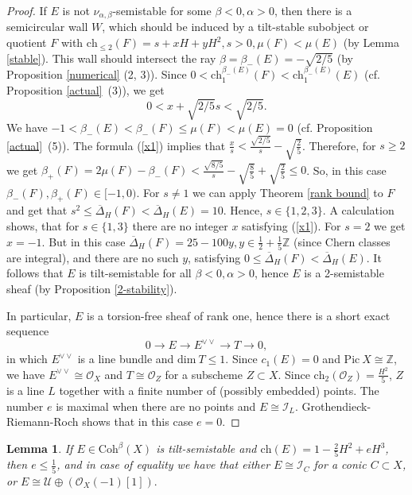 \documentclass{amsart}
\newtheorem{lemma}[theorem]{Lemma}
\begin{document}
	\begin{proof}If $E$ is not $\nu_{\alpha,\beta}$-semistable for some $\beta<0,\alpha>0$, then there is a semicircular wall $W$, which should be induced by a tilt-stable subobject or quotient $F$ with $\mathrm{ch}_{\le 2}(F)=s+xH+yH^2,s>0,\mu(F)<\mu(E)$ (by Lemma \ref{stable}). This wall should intersect the ray $\beta=\beta_-(E)=-\sqrt{2/5}$ (by Proposition \ref{numerical} (2, 3)). Since $0<\mathrm{ch}_1^{\beta_-(E)}(F)<\mathrm{ch}_1^{\beta_-(E)}(E)$ (cf. Proposition \ref{actual}~(3)), we get
		\begin{equation}\label{x1}0<x+\sqrt{2/5}s<\sqrt{2/5}.
		\end{equation}
		We have $-1<\beta_-(E)<\beta_-(F)\le\mu(F)<\mu(E)=0$ (cf. Proposition \ref{actual}~(5)). The formula (\ref{x1}) implies that $\frac xs<\frac{\sqrt{2/5}}{s}-\sqrt{\frac 25}$. Therefore, for $s\ge 2$ we get $\beta_+(F)=2\mu(F)-\beta_-(F)<\frac{\sqrt{8/5}}{s}-\sqrt{\frac 85}+\sqrt{\frac 25}\le 0$. So, in this case $\beta_-(F),\beta_+(F)\in[-1,0)$. For $s\neq 1$ we can apply Theorem \ref{rank bound} to $F$ and get that $s^2\le\overline{\Delta}_H(F)<\overline{\Delta}_H(E)=10$. Hence, $s\in\{1,2,3\}$. A calculation shows, that for $s\in\{1,3\}$ there are no integer $x$ satisfying (\ref{x1}). For $s=2$ we get $x=-1$. But in this case $\overline{\Delta}_H(F)=25-100y,y\in\frac 12+\frac 15\mathbb Z$ (since Chern classes are integral), and there are no such $y$, satisfying $0\le\overline{\Delta}_H(F)<\overline{\Delta}_H(E)$. It follows that $E$ is tilt-semistable for all $\beta<0,\alpha>0$, hence $E$ is a 2-semistable sheaf (by Proposition \ref{2-stability}).	
		
		In particular, $E$ is a torsion-free sheaf of rank one, hence there is a short exact sequence
		$$0\to E\to E^{\vee\vee}\to T\to 0,$$
		in which $E^{\vee\vee}$ is a line bundle and $\mathrm{dim}\ T\le 1$. Since $c_1(E)=0$ and $\mathrm{Pic}\ X\cong\mathbb Z$, we have $E^{\vee\vee}\cong\mathcal O_X$ and $T\cong\mathcal O_Z$ for a subscheme $Z\subset X$. Since $\mathrm{ch}_2(\mathcal O_Z)=\frac{H^2}{5}$, $Z$ is a line $L$ together with a finite number of (possibly embedded) points. The number $e$ is maximal when there are no points and $E\cong\mathcal I_L$. Grothendieck-Riemann-Roch shows that in this case $e=0$.
	\end{proof}
	
	\begin{lemma}\label{conic}If $E\in\mathrm{Coh}^\beta(X)$ is tilt-semistable and $\mathrm{ch}(E)=1-\frac 25H^2+eH^3$, then $e\le\frac 15$, and in case of equality we have that either $E\cong\mathcal I_C$ for a conic $C\subset X$, or $E\cong\mathcal U\oplus(\mathcal O_X(-1)[1]).$
	\end{lemma}
	
\end{document}
